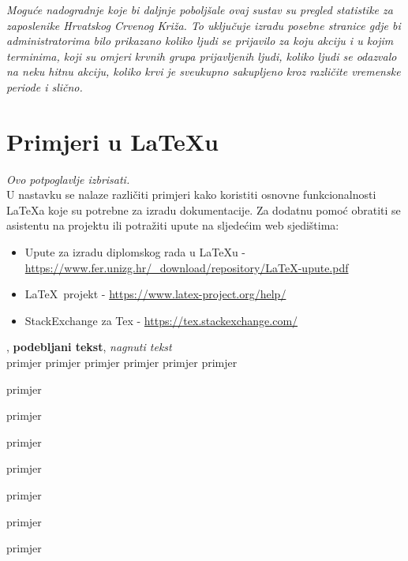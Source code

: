 		\textit{Moguće nadogradnje koje bi daljnje poboljšale ovaj sustav su pregled statistike za zaposlenike Hrvatskog Crvenog Križa. To uključuje izradu posebne stranice gdje bi administratorima bilo prikazano koliko ljudi se prijavilo za koju akciju i u kojim terminima, koji su omjeri krvnih grupa prijavljenih ljudi, koliko ljudi se odazvalo na neku hitnu akciju, koliko krvi je sveukupno sakupljeno kroz različite vremenske periode i slično.}



		\eject
		
		\section{Primjeri u \LaTeX u}
		
		\textit{Ovo potpoglavlje izbrisati.}\\

		U nastavku se nalaze različiti primjeri kako koristiti osnovne funkcionalnosti \LaTeX a koje su potrebne za izradu dokumentacije. Za dodatnu pomoć obratiti se asistentu na projektu ili potražiti upute na sljedećim web sjedištima:
		\begin{itemize}
			\item Upute za izradu diplomskog rada u \LaTeX u - \url{https://www.fer.unizg.hr/_download/repository/LaTeX-upute.pdf}
			\item \LaTeX\ projekt - \url{https://www.latex-project.org/help/}
			\item StackExchange za Tex - \url{https://tex.stackexchange.com/}\\
		
		\end{itemize} 	


		
		\noindent {}, \textbf{podebljani tekst}, 	\textit{nagnuti tekst}\\
		\noindent \normalsize primjer \large primjer \Large primjer \LARGE {primjer} \huge {primjer} \Huge primjer \normalsize
				
		\begin{packed_item}
			
			\item  primjer
			\item  primjer
			\item  primjer
			\item[] \begin{packed_enum}
				\item primjer
				\item[] \begin{packed_enum}
					\item[1.a] primjer
					\item[b] primjer
				\end{packed_enum}
				\item primjer
			\end{packed_enum}
			
		\end{packed_item}
		
